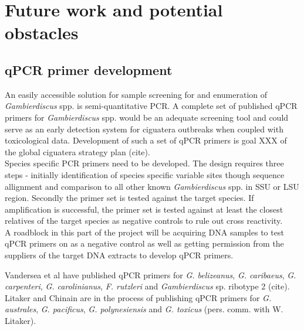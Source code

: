 \documentclass[12pt]{article}
\begin{document}



\section{Future work and potential obstacles}

\subsection{qPCR primer development}
An easily accessible solution for sample screening for and enumeration of \emph{Gambierdiscus} spp. is  semi-quantitative PCR. A complete set of published qPCR primers for \emph{Gambierdiscus} spp. would be an adequate screening tool and could serve as an early detection system for ciguatera outbreaks when coupled with toxicological data. Development of such a set of qPCR primers is goal XXX of the global ciguatera strategy plan (cite). \\
Species specific PCR primers need to be developed. The design requires three steps - initially identification of species specific variable sites though sequence allignment and comparison to all other known \emph{Gambierdiscus} spp. in SSU or LSU region. Secondly the primer set is tested against the target species. If amplification is successful, the primer set is tested against at least the closest relatives of the target species as negative controls to rule out cross reactivity. \\
A roadblock in this part of the project will be acquiring DNA samples to test qPCR primers on as a negative control as well as getting permission from the suppliers of the target DNA extracts to develop qPCR primers.

Vandersea et al have published qPCR primers for \emph{G. belizeanus}, \emph{G. caribaeus}, \emph{G. carpenteri}, \emph{G. carolinianus}, \emph{F. rutzleri} and \emph{Gambierdiscus} sp. ribotype 2 (cite). Litaker and Chinain are in the process of publishing qPCR primers for \emph{G. australes}, \emph{G. pacificus}, \emph{G. polynesiensis} and \emph{G. toxicus} (pers. comm. with W. Litaker).
\end{document}
